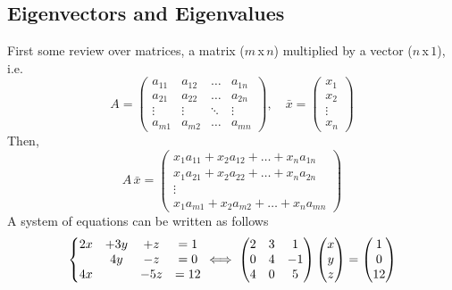 \documentclass[diffeq.tex]{subfiles}
\begin{document}
    \subsection{Eigenvectors and Eigenvalues}
    First some review over matrices, a matrix ($m$\,x\,$n$) multiplied by a vector ($n$\,x\,$1$), i.e.
    \begin{equation}
        A = \begin{pmatrix}
            a_{11} & a_{12} & \dots & a_{1n}\\
            a_{21} & a_{22} & \dots & a_{2n}\\
            \vdots & \vdots & \ddots & \vdots\\
            a_{m1} & a_{m2} & \dots & a_{mn}
        \end{pmatrix},\quad \bar{x} = \begin{pmatrix}
            x_{1}\\
            x_{2}\\
            \vdots\\
            x_{n}
        \end{pmatrix}
    \end{equation}
    Then,
    \begin{equation}
        A\,\bar{x} = \begin{pmatrix}
            x_{1}a_{11} + x_{2}a_{12} + \dots + x_{n}a_{1n}\\
            x_{1}a_{21} + x_{2}a_{22} + \dots + x_{n}a_{2n}\\
            \vdots \\
            x_{1}a_{m1} + x_{2}a_{m2} + \dots + x_{n}a_{mn}
        \end{pmatrix}
    \end{equation}
    A system of equations can be written as follows
    \begin{equation}
        \left\{\begin{array}{@{}cccc@{}}
            2x &+3y &+ z &= 1\\
            &4y &-z &= 0\\
            4x &&-5z &= 12
            \end{array}\right.
        \iff
        \begin{pmatrix}
            2 & 3 & 1\\
            0 & 4 & -1\\
            4 & 0 & 5
        \end{pmatrix}
        \begin{pmatrix}
            x \\ y \\ z
        \end{pmatrix}
        =
        \begin{pmatrix}
            1 \\ 0 \\ 12
        \end{pmatrix}
    \end{equation}
\end{document}
